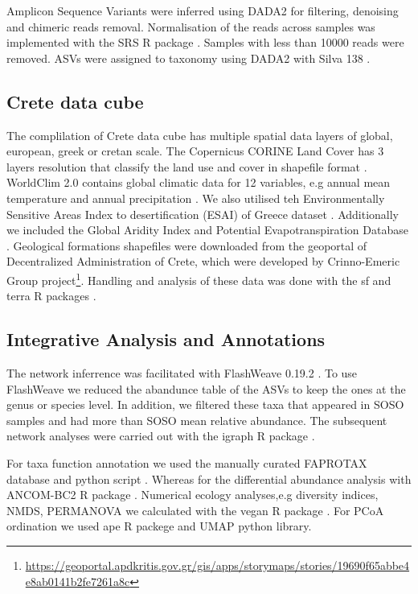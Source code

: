 \documentclass[unnumsec,webpdf,contemporary,large]{oup-authoring-template}%
\theoremstyle{thmstyleone}%
\theoremstyle{thmstyletwo}%
\theoremstyle{thmstylethree}%
\begin{document}
Amplicon Sequence Variants were inferred using DADA2 \cite{Callahan2016} for 
filtering, denoising and chimeric reads removal. Normalisation of the reads
across samples was implemented with the SRS R package \cite{Beule2020}. Samples
with less than 10000 reads were removed. ASVs were assigned to taxonomy using 
DADA2 with Silva 138 \cite{Quast2012}.

\subsection{Crete data cube}\label{data}

The complilation of Crete data cube has multiple spatial data layers of global,
european, greek or cretan scale. 
The Copernicus CORINE Land Cover has 3 layers resolution that classify the land
use and cover in shapefile format \cite{CLC2023}. 
WorldClim 2.0 contains global climatic data for 12 variables, e.g annual mean
temperature and annual precipitation \cite{Fick2017}.
We also utilised teh Environmentally Sensitive Areas Index to desertification (ESAI) 
of Greece dataset \cite{KARAMESOUTI2018266}. Additionally we included the 
Global Aridity Index and Potential Evapotranspiration Database \cite{zomer2022version}.
Geological formations shapefiles were downloaded from the geoportal of
Decentralized Administration of Crete, which were developed by
Crinno-Emeric Group project\footnote{\url{https://geoportal.apdkritis.gov.gr/gis/apps/storymaps/stories/19690f65abbe4e8ab0141b2fe7261a8c}}.
Handling and analysis of these data was done with the sf and terra R packages \cite{Pebesma2023}.

\subsection{Integrative Analysis and Annotations}\label{int_analysis}
The network inferrence was facilitated with FlashWeave 0.19.2 \cite{Tackmann2019}.
To use FlashWeave we reduced 
the abandunce table of the ASVs to keep the ones at the genus or species level.
In addition, we filtered these taxa that appeared in SOSO samples and had more than 
SOSO mean relative abundance. The subsequent network analyses were carried out
with the igraph R package \cite{Csardi2006}.

For taxa function annotation we used the manually curated FAPROTAX database and python script \cite{Louca2016}.
Whereas for the differential abundance analysis with ANCOM-BC2 R package \cite{Lin2023}.
Numerical ecology analyses,e.g diversity indices, NMDS, PERMANOVA we calculated
with the vegan R package \cite{vegan}.
For PCoA ordination we used ape R packege \cite{Paradis2004} and UMAP python library\cite{mcinnes2018umap-software}.
\end{document}

